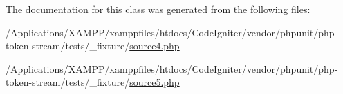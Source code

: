 The documentation for this class was generated from the following files\+:\begin{DoxyCompactItemize}
\item 
/\+Applications/\+X\+A\+M\+P\+P/xamppfiles/htdocs/\+Code\+Igniter/vendor/phpunit/php-\/token-\/stream/tests/\+\_\+fixture/\mbox{\hyperlink{source4_8php}{source4.\+php}}\item 
/\+Applications/\+X\+A\+M\+P\+P/xamppfiles/htdocs/\+Code\+Igniter/vendor/phpunit/php-\/token-\/stream/tests/\+\_\+fixture/\mbox{\hyperlink{source5_8php}{source5.\+php}}\end{DoxyCompactItemize}
